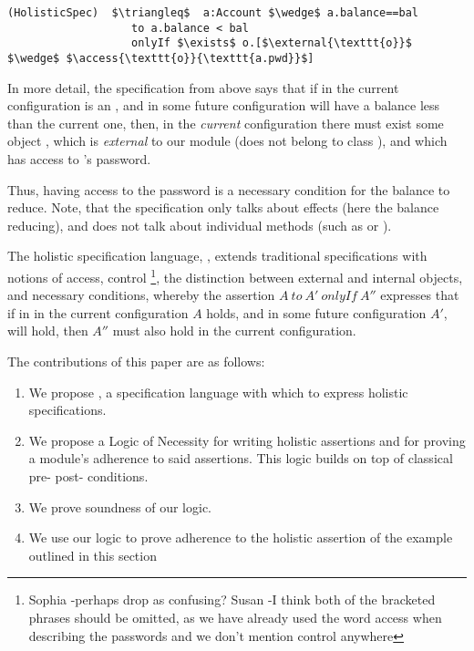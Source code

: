  \begin{lstlisting}[language = Chainmail, mathescape=true, frame=lines]
(HolisticSpec)  $\triangleq$  a:Account $\wedge$ a.balance==bal
                   to a.balance < bal
                   onlyIf $\exists$ o.[$\external{\texttt{o}}$ $\wedge$ $\access{\texttt{o}}{\texttt{a.pwd}}$]
\end{lstlisting}
 
 
 In more detail, the specification from above says that if in the current
 configuration  is an ,
 and in some future configuration  will have a balance less than the current one, then, in the \emph{current} configuration
 there must exist some object , which is \emph{external} to our module (does not belong to class
 ), and which has access to 's password.
 
 
 Thus, having access to the password is a necessary condition for the balance to reduce.
 Note, that the specification only talks about effects (here the balance reducing), and does not
 talk about individual methods (such as  or ).
 

 The holistic specification language, \Chainmail, extends traditional specifications with
notions of access, %
control 
\footnote{Sophia -perhaps drop as confusing? Susan -I think both of the bracketed phrases should be omitted, as we have already used the word access when describing the passwords and we don't mention control anywhere}, 
 the distinction between external and internal objects, and necessary conditions, 
 whereby the assertion $A~to~A'~onlyIf~A''$ expresses that if in in the current configuration
 $A$ holds, and in some future configuration $A'$, 
 will hold, then $A''$ must also hold in the 
 current configuration.  
  
 The contributions of this paper are as follows:
 
 \begin{enumerate}
 \item
 We propose \Chainmail, a specification language with which to
express holistic specifications. 
 \item
  We propose a Logic of Necessity for writing holistic assertions and for proving a module's adherence to said assertions.
 This logic builds on top of classical pre- post- conditions.
 \item
 We prove soundness of our logic.  
 \item
 We use our logic to prove adherence to the holistic assertion of the example
outlined  in this section
 \end{enumerate}
 
